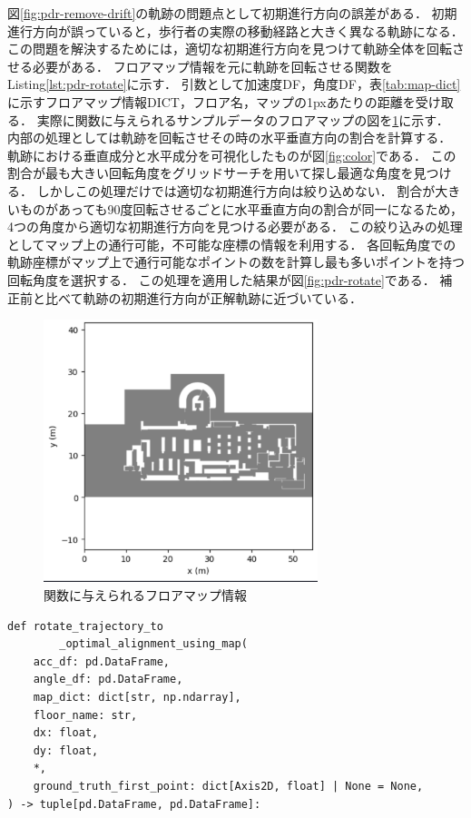 
図\ref{fig:pdr-remove-drift}の軌跡の問題点として初期進行方向の誤差がある．
初期進行方向が誤っていると，歩行者の実際の移動経路と大きく異なる軌跡になる．
この問題を解決するためには，適切な初期進行方向を見つけて軌跡全体を回転させる必要がある．
フロアマップ情報を元に軌跡を回転させる関数をListing\ref{lst:pdr-rotate}に示す．
引数として加速度DF，角度DF，表\ref{tab:map-dict}に示すフロアマップ情報DICT，フロア名，マップの1pxあたりの距離を受け取る．
実際に関数に与えられるサンプルデータのフロアマップの図を\ref{fig:floor-map}に示す．
内部の処理としては軌跡を回転させその時の水平垂直方向の割合を計算する．
軌跡における垂直成分と水平成分を可視化したものが図\ref{fig:color}である．
この割合が最も大きい回転角度をグリッドサーチを用いて探し最適な角度を見つける．
しかしこの処理だけでは適切な初期進行方向は絞り込めない．
割合が大きいものがあっても90度回転させるごとに水平垂直方向の割合が同一になるため，
4つの角度から適切な初期進行方向を見つける必要がある．
この絞り込みの処理としてマップ上の通行可能，不可能な座標の情報を利用する．
各回転角度での軌跡座標がマップ上で通行可能なポイントの数を計算し最も多いポイントを持つ回転角度を選択する．
この処理を適用した結果が図\ref{fig:pdr-rotate}である．
補正前と比べて軌跡の初期進行方向が正解軌跡に近づいている．

\begin{figure}[ht]
	\centering
	\includegraphics[width=80mm]{image/floor-map.jpg}
	\caption{関数に与えられるフロアマップ情報}    \label{fig:floor-map}
\end{figure}


\begin{lstlisting}[caption={初期進行方向補正}, label=lst:pdr-rotate]
def rotate_trajectory_to
		_optimal_alignment_using_map(
    acc_df: pd.DataFrame,
    angle_df: pd.DataFrame,
    map_dict: dict[str, np.ndarray],
    floor_name: str,
    dx: float,
    dy: float,
    *,
    ground_truth_first_point: dict[Axis2D, float] | None = None,
) -> tuple[pd.DataFrame, pd.DataFrame]:
\end{lstlisting}

